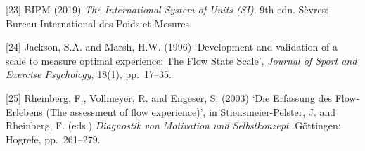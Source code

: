 \documentclass[12pt,a4paper]{article}
\begin{document}
{[}23{]} BIPM (2019) \emph{The International System of Units (SI)}. 9th edn. Sèvres: Bureau International des Poids et Mesures.



{[}24{]} Jackson, S.A. and Marsh, H.W. (1996) `Development and validation of a scale to measure optimal experience: The Flow State Scale', \emph{Journal of Sport and Exercise Psychology}, 18(1), pp.~17--35.



{[}25{]} Rheinberg, F., Vollmeyer, R. and Engeser, S. (2003) `Die Erfassung des Flow-Erlebens (The assessment of flow experience)', in Stiensmeier-Pelster, J. and Rheinberg, F. (eds.) \emph{Diagnostik von Motivation und Selbstkonzept}. Göttingen: Hogrefe, pp.~261--279.
\end{document}
